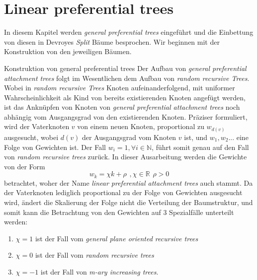 \chapter{Linear preferential trees}\label{chapter linear preferential trees}
In diesem Kapitel werden \textit{general preferential trees} eingeführt und die Einbettung von diesen in Devroyes \textit{Split} Bäume besprochen. Wir beginnen mit der Konstruktion von den jeweiligen Bäumen.
\begin{section}{Konstruktion von general preferential trees}
Der Aufbau von \textit{general preferential attachment trees} folgt im Wesentlichen dem Aufbau von \textit{random recursive Trees}. Wobei in \textit{random recursive Trees} Knoten aufeinanderfolgend, mit uniformer Wahrscheinlichkeit als Kind von bereits existierenden Knoten angefügt werden, ist das Anknüpfen von Knoten von \textit{general preferential attachment trees} noch abhängig vom Ausgangsgrad von den existierenden Knoten. Präziser formuliert, wird der Vaterknoten $v$ von einem neuen Knoten, proportional zu $w_{d(v)}$ ausgesucht, wobei $d(v)$ der Ausgangsgrad vom Knoten $v$ ist, und $w_1, w_2...$ eine Folge von Gewichten ist. Der Fall $w_i = 1, \forall i \in \mathbb{N}$, führt somit genau auf den Fall von \textit{random recursive trees} zurück. In dieser Ausarbeitung werden die Gewichte von der Form 
\[
w_k = \chi k + \rho \hspace{5pt}, \chi \in \mathbb{R}\hspace{5pt} \rho > 0
\]
betrachtet, woher der Name \textit{linear preferential attachment trees} auch stammt. Da der Vaterknoten lediglich proportional zu der Folge von Gewichten ausgesucht wird, ändert die Skalierung der Folge nicht die Verteilung der Baumstruktur, und somit kann die Betrachtung von den Gewichten auf 3 Spezialfälle unterteilt werden:
\begin{enumerate}
    \item $\chi = 1$ ist der Fall vom \textit{general plane oriented recursive trees} \cite{panholzer2007level} 
    \item $\chi = 0$ ist der Fall vom \textit{random recursive trees}
    \item $\chi = -1$ ist der Fall von \textit{m-ary increasing trees}.

\end{enumerate}
\end{section}
